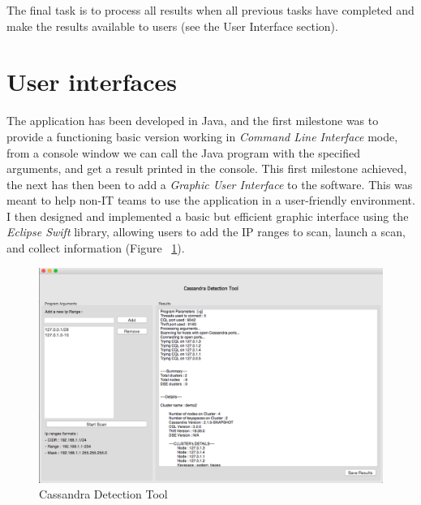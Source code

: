 \documentclass[a4paper]{report}
\begin{document}
The final task is to process all results when all previous tasks have completed and make the results available to users (see the User Interface section).

\section{User interfaces}
The application has been developed in Java, and the first milestone was to provide a functioning basic version working in \emph{Command Line Interface} mode, from a console window we can call the Java program with the specified arguments, and get a result printed in the console. This first milestone achieved, the next has then been to add a \emph{Graphic User Interface} to the software. This was meant to help non-IT teams to use the application in a user-friendly environment. I then designed and implemented a basic but efficient graphic interface using the \emph{Eclipse Swift} library, allowing users to add the IP ranges to scan, launch a scan, and collect information (Figure ~\ref{fig:cdt}).

\begin{figure}[ht!]
\centering
\includegraphics[scale=0.37]{cdt-preview.png}
\caption{Cassandra Detection Tool}
\label{fig:cdt}
\end{figure}
\end{document}

